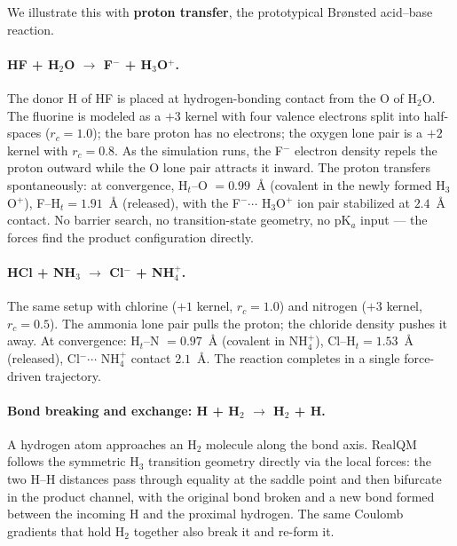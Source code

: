 \documentclass[11pt]{article}
\begin{document}
We illustrate this with \textbf{proton transfer}, the prototypical Br\o nsted acid--base reaction.

\paragraph{HF + H$_2$O $\to$ F$^-$ + H$_3$O$^+$.}
The donor H of HF is placed at hydrogen-bonding contact from the O of H$_2$O. The fluorine is modeled as a $+3$ kernel with four valence electrons split into half-spaces ($r_c = 1.0$); the bare proton has no electrons; the oxygen lone pair is a $+2$ kernel with $r_c = 0.8$. As the simulation runs, the F$^-$ electron density repels the proton outward while the O lone pair attracts it inward. The proton transfers spontaneously: at convergence, H$_t$--O $= 0.99$~\AA{} (covalent in the newly formed H$_3$O$^+$), F--H$_t = 1.91$~\AA{} (released), with the F$^- \cdots$ H$_3$O$^+$ ion pair stabilized at $2.4$~\AA{} contact. No barrier search, no transition-state geometry, no pK$_a$ input --- the forces find the product configuration directly.

\paragraph{HCl + NH$_3$ $\to$ Cl$^-$ + NH$_4^+$.}
The same setup with chlorine ($+1$ kernel, $r_c = 1.0$) and nitrogen ($+3$ kernel, $r_c = 0.5$). The ammonia lone pair pulls the proton; the chloride density pushes it away. At convergence: H$_t$--N $= 0.97$~\AA{} (covalent in NH$_4^+$), Cl--H$_t = 1.53$~\AA{} (released), Cl$^- \cdots$ NH$_4^+$ contact $2.1$~\AA{}. The reaction completes in a single force-driven trajectory.

\paragraph{Bond breaking and exchange: H + H$_2$ $\to$ H$_2$ + H.}
A hydrogen atom approaches an H$_2$ molecule along the bond axis. RealQM follows the symmetric H$_3$ transition geometry directly via the local forces: the two H--H distances pass through equality at the saddle point and then bifurcate in the product channel, with the original bond broken and a new bond formed between the incoming H and the proximal hydrogen. The same Coulomb gradients that hold H$_2$ together also break it and re-form it.
\end{document}
